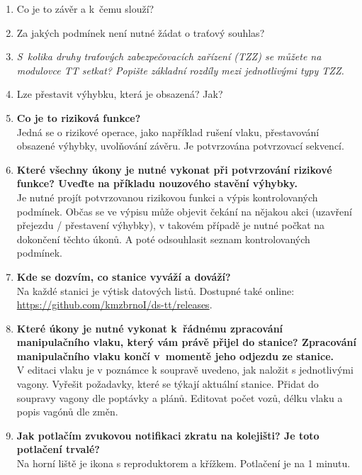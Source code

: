 \documentclass[12pt,a4paper]{article}
\begin{document}
\begin{enumerate}[leftmargin=*]
\item Co je to závěr a k~čemu slouží?

\item Za jakých podmínek není nutné žádat o traťový souhlas?

\item \textit{S~kolika druhy traťových zabezpečovacích zařízení (TZZ) se můžete na
modulovce TT setkat? Popište základní rozdíly mezi jednotlivými typy TZZ.}

\item Lze přestavit výhybku, která je obsazená? Jak?

\item \textbf{Co je to riziková funkce?}
\\Jedná se o rizikové operace, jako například rušení vlaku, přestavování obsazené výhybky, uvolňování závěru. Je potvrzována potvrzovací sekvencí.

\item \textbf{Které všechny úkony je nutné vykonat při potvrzování rizikové funkce?
Uveďte na příkladu nouzového stavění výhybky.}
\\Je nutné projít potvrzovanou rizikovou funkci a výpis kontrolovaných podmínek. Občas se ve výpisu může objevit čekání na nějakou akci (uzavření přejezdu / přestavení výhybky), v takovém případě je nutné počkat na dokončení těchto úkonů. A poté odsouhlasit seznam kontrolovaných podmínek.

\item \textbf{Kde se dozvím, co stanice vyváží a dováží?}
\\Na každé stanici je výtisk datových listů. Dostupné také online: \url{https://github.com/kmzbrnoI/ds-tt/releases}.

\item \textbf{Které úkony je nutné vykonat k~řádnému zpracování manipulačního vlaku,
který vám právě přijel do stanice? Zpracování manipulačního vlaku končí
v~momentě jeho odjezdu ze stanice.}
\\V editaci vlaku je v poznámce k soupravě uvedeno, jak naložit s jednotlivými vagony. Vyřešit požadavky, které se týkají aktuální stanice. Přidat do soupravy vagony dle poptávky a plánů. Editovat počet vozů, délku vlaku a popis vagónů dle změn.

\item \textbf{Jak potlačím zvukovou notifikaci zkratu na kolejišti? Je toto potlačení
trvalé?}
\\Na horní liště je ikona s reproduktorem a křížkem. Potlačení je na 1 minutu.


\end{enumerate}
\end{document}
